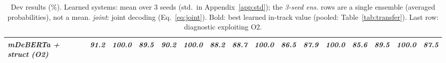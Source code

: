 \begin{table}[t]
{\begin{tabular}{lccccccccccccccc}
\midrule
\textit{mDeBERTa + struct (O2)} & \textit{91.2} & \textit{100.0} & \textit{89.5} & \textit{90.2} & \textit{100.0} & \textit{88.2} & \textit{88.7} & \textit{100.0} & \textit{86.5} & \textit{87.9} & \textit{100.0} & \textit{85.6} & \textit{89.5} & \textit{100.0} & \textit{87.5} \\
\bottomrule
\end{tabular}}
\caption{Dev results (\%). Learned systems: mean over 3 seeds (std.\ in Appendix~\ref{app:std}); the \emph{3-seed ens.} rows are a single ensemble (averaged probabilities), not a mean. \emph{joint}: joint decoding (Eq.~\ref{eq:joint}). Bold: best learned in-track value (pooled: Table~\ref{tab:transfer}). Last row: diagnostic exploiting O2.}
\label{tab:main}
\end{table}
